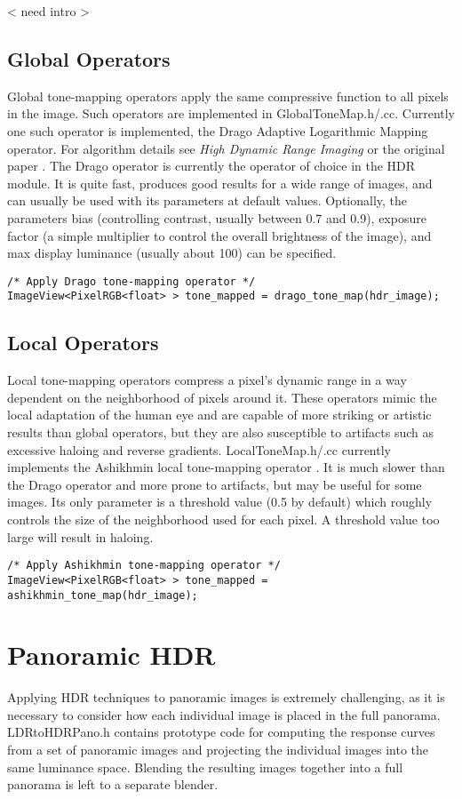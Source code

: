 < need intro >

\subsection{Global Operators}
Global tone-mapping operators apply the same compressive function to
all pixels in the image. Such operators are implemented in
GlobalToneMap.h/.cc. Currently one such operator is implemented, the
Drago Adaptive Logarithmic Mapping operator.  For algorithm details
see \emph{High Dynamic Range Imaging} \cite{hdrbook} or the original
paper \cite{drago}.  The Drago operator is currently the operator of
choice in the HDR module. It is quite fast, produces good results for
a wide range of images, and can usually be used with its parameters at
default values. Optionally, the parameters bias (controlling contrast,
usually between 0.7 and 0.9), exposure factor (a simple multiplier to
control the overall brightness of the image), and max display
luminance (usually about 100) can be specified.

\begin{verbatim}
/* Apply Drago tone-mapping operator */
ImageView<PixelRGB<float> > tone_mapped = drago_tone_map(hdr_image);
\end{verbatim}

\subsection{Local Operators}
Local tone-mapping operators compress a pixel's dynamic range in a way
dependent on the neighborhood of pixels around it. These operators
mimic the local adaptation of the human eye and are capable of more
striking or artistic results than global operators, but they are also
susceptible to artifacts such as excessive haloing and reverse
gradients. LocalToneMap.h/.cc currently implements the Ashikhmin local
tone-mapping operator \cite{ashikhmin}.  It is much slower than the
Drago operator and more prone to artifacts, but may be useful for some
images. Its only parameter is a threshold value (0.5 by default) which
roughly controls the size of the neighborhood used for each pixel. A
threshold value too large will result in haloing.

\begin{verbatim}
/* Apply Ashikhmin tone-mapping operator */
ImageView<PixelRGB<float> > tone_mapped = ashikhmin_tone_map(hdr_image);
\end{verbatim}

\section{Panoramic HDR}
Applying HDR techniques to panoramic images is extremely challenging,
as it is necessary to consider how each individual image is placed in
the full panorama.  LDRtoHDRPano.h contains prototype code for
computing the response curves from a set of panoramic images and
projecting the individual images into the same luminance
space. Blending the resulting images together into a full panorama is
left to a separate blender.

